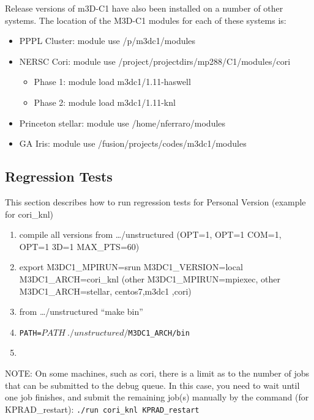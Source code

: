 Release versions of m3D-C1 have also been installed on a number of other systems.   The location of the M3D-C1 modules for each of these systems is:
\begin{itemize}
\item	PPPL Cluster:	module use /p/m3dc1/modules
\item	NERSC Cori:	module use /project/projectdirs/mp288/C1/modules/cori
\begin{itemize}
\item		Phase 1: module load m3dc1/1.11-haswell
\item		Phase 2: module load m3dc1/1.11-knl
\end{itemize}
\item	Princeton stellar:	module use /home/nferraro/modules
\item	GA Iris:		module use /fusion/projects/codes/m3dc1/modules
\end{itemize}
\subsection{Regression Tests}
This section describes how to run regression tests for Personal Version (example for cori\_knl)
\begin{enumerate}
\item compile all versions from …/unstructured  (OPT=1, OPT=1 COM=1, OPT=1 3D=1 MAX\_PTS=60)
\item export M3DC1\_MPIRUN=srun M3DC1\_VERSION=local M3DC1\_ARCH=cori\_knl
	(other M3DC1\_MPIRUN=mpiexec, other M3DC1\_ARCH=stellar, centos7,m3dc1 ,cori)
\item from …/unstructured  “make bin”
\item \texttt{PATH=$PATH\: ./unstructured/$M3DC1\_ARCH/bin}
\item 
{}
\end{enumerate}

NOTE:  On some machines, such as cori, there is a limit as to the number of jobs that can be submitted to the debug queue.   In this case, you need to wait until one job finishes, and submit the remaining job(s) manually by the command (for KPRAD\_restart):
\texttt{./run cori\_knl KPRAD\_restart}

